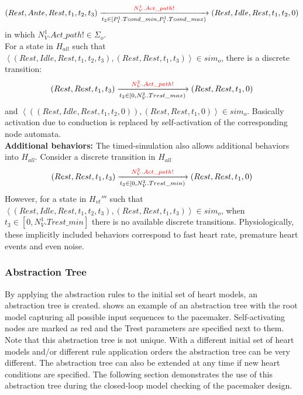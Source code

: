 $$(Rest,Ante,Rest,t_1,t_2,t_3)\xrightarrow[t_2\in [P^1_1.Tcond\_min, P^1_1.Tcond\_max) ]{\textcolor{red}{N^1_V.Act\_path!}}(Rest,Idle,Rest,t_1,t_2,0)$$
in which $N^1_V.Act\_path!\in\Sigma_o$. \\
For a state in $H_{all}$ such that $\left\langle (Rest,Idle,Rest,t_1,t_2,t_3) ,(Rest,Rest,t_1,t_3)\right\rangle\in sim_o$,  there is a discrete transition:
$$(Rest,Rest,t_1,t_3)\xrightarrow[t_3\in [0, N^2_V.Trest\_max)]{\textcolor{red}{N^2_V.Act\_path!}}(Rest,Rest,t_1,0)$$
and $\left\langle ((Rest,Idle,Rest,t_1,t_2,0)),(Rest,Rest,t_1,0)\right\rangle\in sim_o$. Basically activation due to conduction is replaced by self-activation of the corresponding node automata.\\
\textbf{Additional behaviors: }The timed-simulation also allows additional behaviors into $H_{all}$. Consider a discrete transition in $H_{all}$
$$(Rest,Rest,t_1,t_3)\xrightarrow[t_3\in [0, N^2_V.Trest\_min)]{\textcolor{red}{N^2_V.Act\_path!}}(Rest,Rest,t_1,0)$$
However, for a state in $H_{vt}'''$ such that $\left\langle (Rest,Idle,Rest,t_1,t_2,t_3),(Rest,Rest,t_1,t_3)\right\rangle\in sim_o$, when $t_3\in [0, N^1_V.Trest\_min]$ there is no available discrete transitions. Physiologically, these implicitly included behaviors correspond to fast heart rate, premature heart events and even noise.



\subsubsection{Abstraction Tree}
By applying the abstraction rules to the initial set of heart models, an abstraction tree is created.
 shows an example of an abstraction tree with the root model capturing all possible input sequences to the pacemaker.
Self-activating nodes are marked as red and the Trest parameters are specified next to them.
Note that this abstraction tree is not unique.
With a different initial set of heart models and/or different rule application orders the abstraction tree can be very different.
The abstraction tree can also be extended at any time if new heart conditions are specified.
The following section demonstrates the use of this abstraction tree during the closed-loop model checking of the pacemaker design.

